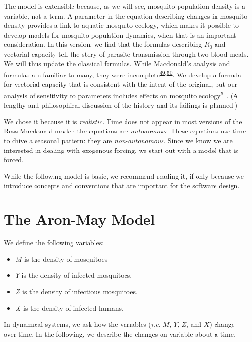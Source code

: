 \documentclass[
]{book}
\begin{document}
The model is extensible because, as we will see, mosquito population density is a variable, not a term. A parameter in the equation describing changes in mosquito density provides a link to aquatic mosquito ecology, which makes it possible to develop models for mosquito population dynamics, when that is an important consideration. In this version, we find that the formulas describing \(R_0\) and vectorial capacity tell the story of parasite transmission through two blood meals. We will thus update the classical formulas. While Macdonald's analysis and formulas are familiar to many, they were incomplete\textsuperscript{\protect\hyperlink{ref-SmithDL2004_Statics}{49},\protect\hyperlink{ref-SmithDL2021_NewTestOldMosquitoes}{50}}. We develop a formula for vectorial capacity that is consistent with the intent of the original, but our analysis of sensitivity to parameters includes effects on mosquito ecology\textsuperscript{\protect\hyperlink{ref-BradyOJ2015AdultVector}{51}}. (A lengthy and philosophical discussion of the history and its failings is planned.)

We chose it because it is \emph{realistic.} Time does not appear in most versions of the Ross-Macdonald model: the equations are \emph{autonomous}. These equations use time to drive a seasonal pattern: they are \emph{non-autonomous}. Since we know we are interested in dealing with exogenous forcing, we start out with a model that is forced.

While the following model is basic, we recommend reading it, if only because we introduce concepts and conventions that are important for the software design.

\hypertarget{the-aron-may-model}{%
\section{The Aron-May Model}\label{the-aron-may-model}}

We define the following variables:

\begin{itemize}
\item
  \(M\) is the density of mosquitoes.
\item
  \(Y\) is the density of infected mosquitoes.
\item
  \(Z\) is the density of infectious mosquitoes.
\item
  \(X\) is the density of infected humans.
\end{itemize}

In dynamical systems, we ask how the variables (\emph{i.e.} \(M\), \(Y\), \(Z\), and \(X\)) change over time. In the following, we describe the changes on variable about a time.
\end{document}
